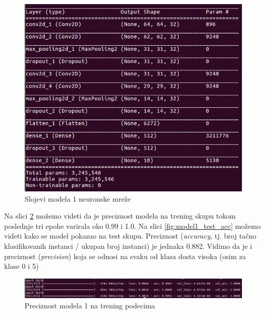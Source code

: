 \documentclass[a4paper]{article}
\begin{document}
\begin{figure}[h!]
\begin{center}
\includegraphics[scale=0.40]{model1_arhitektura.png}
\end{center}
\caption{Slojevi modela 1 neuronske mreže}
\label{fig:model1_arh}
\end{figure}

Na slici \ref{fig:model1_trening_acc} možemo videti da je preciznost modela na trening skupu tokom poslednje tri epohe varirala oko 0.99 i 1.0. Na slici \ref{fig:model1_test_acc} možemo videti kako se model pokazao na test skupu. Preciznost (\textit{accuracy}, tj. broj tačno klasifikovanih instanci / ukupan broj instanci) je jednaka 0.882. Vidimo da je i preciznost (\textit{precision}) koja se odnosi na svaku od klasa dosta visoka (osim za klase 0 i 5)

\begin{figure}[h!]
\begin{center}
\includegraphics[scale=0.35]{model1_trening_acc.png}
\end{center}
\caption{Preciznost modela 1 na trening podecima}
\label{fig:model1_trening_acc}
\end{figure}
\end{document}
